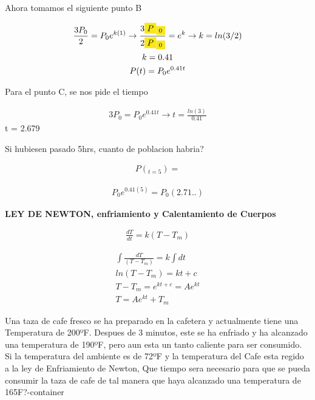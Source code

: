 \documentclass{article}
\begin{document}
Ahora tomamos el siguiente\colorbox[RGB]{248,231,28}{ punto B}


\begin{gather*}
\frac{3P_{0}}{2} =P_{0}e^{k(1)}  \rightarrow \frac{3\text{\colorbox[RGB]{248,231,28}{$P$}}\text{\colorbox[RGB]{248,231,28}{$_{0}$}}}{2\text{\colorbox[RGB]{248,231,28}{$P$}}\text{\colorbox[RGB]{248,231,28}{$_{0}$}}}=e^{k}  \rightarrow k=ln(3/2) \\
k=0.41 \\
P(t) =P_{0}e^{0.41t} 
\end{gather*}


Para el punto C, se nos pide el tiempo


\begin{gather*}
3P_{0} =P_{0}e^{0.41t} \rightarrow  t=\frac{ln(3)}{0.41}  
\end{gather*}
t = 2.679



Si hubiesen pasado 5hrs, cuanto de poblacion habria?


\begin{gather*}
P(_{t=5})= 
\end{gather*}
 
\begin{gather*}
P_{0}e^{0.41(5)} =P_{0}(2.71..) 
\end{gather*}




\textbf{LEY DE NEWTON, enfriamiento y Calentamiento de Cuerpos}


\begin{gather*}
\frac{dT}{dt}= k(T - T_{m})
\end{gather*}



\begin{gather*}
\int \frac{dT}{(T - T_{m})}= k\int dt \\
ln(T - T_{m}) =kt+c \\
T-T_{m}=e^{kt+c}=Ae^{kt} \\
T=Ae^{kt}+T_{m}
\end{gather*}
    



Una taza de cafe fresco se ha preparado en la cafetera y actualmente tiene una Temperatura de 200ºF. Despues de 3 minutos, este se ha enfriado y ha alcanzado una temperatura de 190ºF, pero aun esta un tanto caliente para ser consumido. Si la temperatura del ambiente es de 72ºF y la temperatura del Cafe esta regido a la ley de Enfriamiento de Newton, Que tiempo sera necesario para que se pueda consumir la taza de cafe de tal manera que haya alcanzado una temperatura de 165F?\image-container
\end{document}
